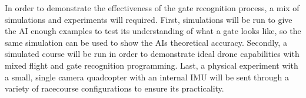 \documentclass[onecolumn,10pt]{IEEEtran}
\begin{document}
In order to demonstrate the effectiveness of the gate recognition process, a mix of simulations and experiments will required. First, simulations will be run to give the AI enough examples to test its understanding of what a gate looks like, so the same simulation can be used to show the AIs theoretical accuracy. Secondly, a simulated course will be run in order to demonstrate ideal drone capabilities with mixed flight and gate recognition programming. Last, a physical experiment with a small, single camera quadcopter with an internal IMU will be sent through a variety of racecourse configurations to ensure its practicality.

\end{document}
